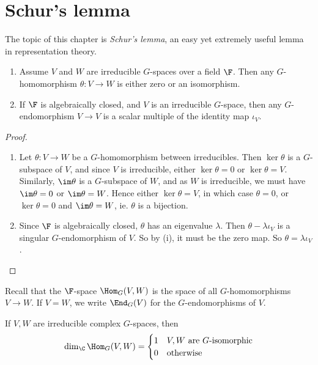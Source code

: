 \documentclass[a4paper]{article}
\begin{document}
\section{Schur's lemma}
The topic of this chapter is \emph{Schur's lemma}, an easy yet extremely useful lemma in representation theory.

\begin{thm}\leavevmode
  \begin{enumerate}
    \item Assume $V$ and $W$ are irreducible $G$-spaces over a field $\F$. Then any $G$-homomorphism $\theta: V \to W$ is either zero or an isomorphism.
    \item If $\F$ is algebraically closed, and $V$ is an irreducible $G$-space, then any $G$-endomorphism $V \to V$ is a scalar multiple of the identity map $\iota_V$.
  \end{enumerate}
\end{thm}

\begin{proof}\leavevmode
  \begin{enumerate}
    \item Let $\theta: V \to W$ be a $G$-homomorphism between irreducibles. Then $\ker \theta$ is a $G$-subspace of $V$, and since $V$ is irreducible, either $\ker \theta = 0$ or $\ker \theta = V$. Similarly, $\im \theta$ is a $G$-subspace of $W$, and as $W$ is irreducible, we must have $\im \theta = 0$ or $\im \theta = W$. Hence either $\ker \theta = V$, in which case $\theta = 0$, or $\ker \theta = 0$ and $\im \theta = W$, ie. $\theta$ is a bijection.
    \item Since $\F$ is algebraically closed, $\theta$ has an eigenvalue $\lambda$. Then $\theta - \lambda \iota_V$ is a singular $G$-endomorphism of $V$. So by (i), it must be the zero map. So $\theta = \lambda \iota_V$.
  \end{enumerate}
\end{proof}

Recall that the $\F$-space $\Hom_G(V, W)$ is the space of all $G$-homomorphisms $V \to W$. If $V = W$, we write $\End_G(V)$ for the $G$-endomorphisms of $V$.

\begin{cor}
  If $V, W$ are irreducible complex $G$-spaces, then
  \[
    \dim_\C \Hom_G(V, W) =
    \begin{cases}
      1 & V, W\text{ are $G$-isomorphic}\\
      0 & \text{otherwise}
    \end{cases}
  \]
\end{cor}
\end{document}
